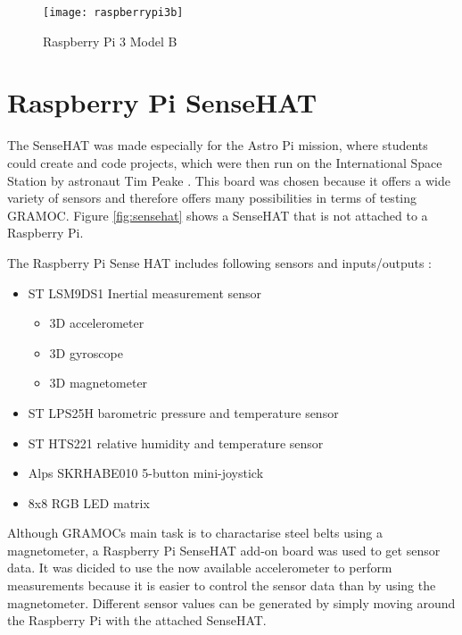 \begin{figure}[H]
	\centering
	\texttt{[image: raspberrypi3b]}
	\caption[Raspberry Pi 3 Model B]{Raspberry Pi 3 Model B \autocite{img:raspi}}
	\label{fig:raspberrypi3b}
\end{figure}

\section{Raspberry Pi SenseHAT}

The SenseHAT was made especially for the Astro Pi mission, where students could create and code projects, which were then run on the International Space Station by astronaut Tim Peake \autocite{AstroPiMission}. This board was chosen because it offers a wide variety of sensors and therefore offers many possibilities in terms of testing GRAMOC. Figure \vref{fig:sensehat} shows a SenseHAT that is not attached to a Raspberry Pi.

The Raspberry Pi Sense HAT includes following sensors and inputs/outputs \autocite{SenseHAT}:

\begin{minipage}{\textwidth}
\begin{itemize}
	\item ST LSM9DS1 Inertial measurement sensor
		\begin{itemize}
			\item 3D accelerometer
			\item 3D gyroscope
			\item 3D magnetometer
		\end{itemize}
	\item ST LPS25H barometric pressure and temperature sensor
	\item ST HTS221 relative humidity and temperature sensor
	\item Alps SKRHABE010 5-button mini-joystick
	\item 8x8 RGB LED matrix
\end{itemize}
\end{minipage}

Although GRAMOCs main task is to charactarise steel belts using a magnetometer, a Raspberry Pi SenseHAT add-on board was used to get sensor data. It was dicided to use the now available accelerometer to perform measurements because it is easier to control the sensor data than by using the magnetometer. Different sensor values can be generated by simply moving around the Raspberry Pi with the attached SenseHAT.

